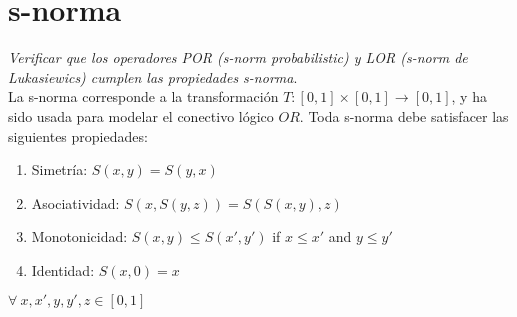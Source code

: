 \documentclass[letterpaper,spanish,11pt]{article}
\begin{document}
\section{s-norma}
\emph{Verificar que los operadores POR (s-norm probabilistic) y LOR (s-norm de
Lukasiewics) cumplen las propiedades s-norma}.\\

La s-norma corresponde a la transformaci\'{o}n $T:[0,1] \times [0,1]
\rightarrow [0,1]$, y ha sido usada para modelar el conectivo l\'{o}gico $OR$.
Toda s-norma debe satisfacer las siguientes propiedades:

\begin{enumerate}
\item Simetr\'{i}a: $S(x,y)=S(y,x)$
\item Asociatividad: $S(x,S(y,z))=S(S(x,y),z)$
\item Monotonicidad: $S(x,y) \leq S(x',y')$ if $x\leq x'$ and $y\leq y'$
\item Identidad: $S(x,0)=x$
\end{enumerate}
$\forall \ x,x',y,y',z \in [0,1]$
\end{document}
